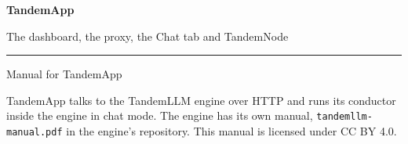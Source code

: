 \begin{titlepage}
\thispagestyle{empty}
\vspace*{.22\textheight}
{\centering
{\usebox{\tandemcoverbox}\par}
\vspace{6ex}
{\sffamily\bfseries\Huge TandemApp\par}
\vspace{2ex}
{\sffamily\Large The dashboard, the proxy, the Chat tab and TandemNode\par}
\vspace{4ex}
{\color{signal}\rule{3cm}{1.2pt}\par}
\vspace{4ex}
{\sffamily\large Manual for TandemApp \version\par}
\vspace{1ex}
{\sffamily\small\color{slate}\manualdate\par}
}
\vfill
{\small\color{slate} TandemApp talks to the TandemLLM engine over HTTP and runs its conductor inside the engine in chat mode. The engine has its own manual, \texttt{tandemllm-manual.pdf} in the engine's repository. This manual is licensed under CC BY 4.0.\par}
\end{titlepage}
